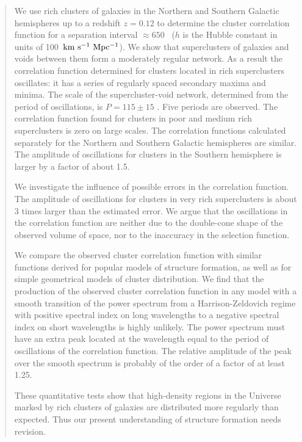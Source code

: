 \begin{abstract} 

We use rich clusters of galaxies in the Northern and
Southern Galactic hemispheres up to a redshift $z=0.12$ to determine
the cluster correlation function for a separation interval $\approx 650$
\Mpc\ ($h$ is the Hubble constant in units of 100~${\rm km~s^{-1}~Mpc^{-1}}$).
We show that superclusters of galaxies and voids between them form a
moderately regular network. As a result the correlation function determined
for clusters located in rich superclusters oscillates: it has a series
of regularly spaced secondary maxima and minima. The scale of the
supercluster-void network, determined from the period of oscillations,
is $P=115\pm 15$ \Mpc. Five periods are observed.  The correlation
function found for clusters in poor and medium rich superclusters is
zero on large scales.  The correlation functions calculated separately
for the Northern and Southern Galactic hemispheres are 
similar. The amplitude of oscillations for clusters in the Southern
hemisphere is larger by a factor of about 1.5.
 
We investigate the influence of possible errors in the correlation
function. The amplitude of oscillations for clusters in very rich
superclusters is about 3 times larger than the estimated error. 
We argue that the oscillations in the correlation function are neither
due to the double-cone shape of the observed volume of space, nor to
the inaccuracy in the selection function.

We compare the observed cluster correlation function with similar
functions derived for popular models of structure formation, as well
as for simple geometrical models of cluster distribution. We find 
that the production of the observed cluster correlation function in
any model with a smooth transition of the power spectrum from a
Harrison-Zeldovich regime with positive spectral index on long
wavelengths to a negative spectral index on short wavelengths is
highly unlikely. The power spectrum must have an extra peak located at
the wavelength equal to the period of oscillations of the correlation
function.  The relative amplitude of the peak over the smooth spectrum
is probably of the order of a factor of at least 1.25.  

These quantitative tests show that high-density regions in the Universe
marked by rich clusters of galaxies are distributed more regularly
than expected. Thus our present understanding of structure formation
needs revision.

\end{abstract}

